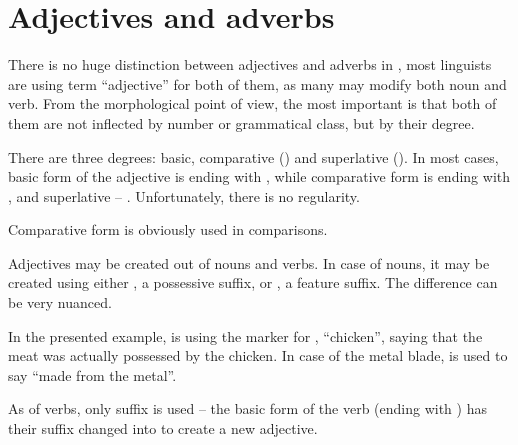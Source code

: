 


\section{Adjectives and adverbs}
\label{sec:morph-adjectives}

There is no huge distinction between adjectives and adverbs in \andro, most
linguists are using term ``adjective'' for both of them, as many may modify both
noun and verb. From the morphological point of view, the most important is that
both of them are not inflected by number or grammatical class, but by their
degree.

There are three degrees: basic, comparative (\Comp{}) and superlative (\Supl{}).
In most cases, basic form of the adjective is ending with , while
comparative form is ending with , and superlative -- . Unfortunately,
there is no regularity.

Comparative form is obviously used in comparisons.



Adjectives may be created out of nouns and verbs. In case of nouns, it may be
created using either , a possessive suffix, or , a feature
suffix. The difference can be very nuanced.



In the presented example,  is using the  marker for
, ``chicken'', saying that the meat was actually possessed by the
chicken. In case of the metal blade,  is used to say ``made from
the metal''.

As of verbs, only  suffix is used -- the basic form of the verb (ending
with ) has their suffix changed into  to create a new adjective.

